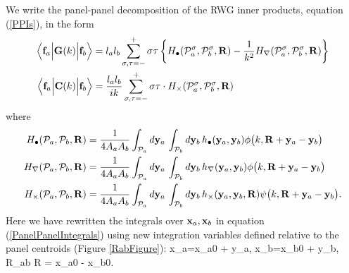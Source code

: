 \documentclass[letterpaper]{article}
\begin{document}
We write the panel-panel decomposition of the RWG inner products,
equation (\ref{PPIs}), in the form
\begin{subequations}
\begin{align}
 \Big\langle \mathbf{f}_a \Big| \mathbf{G}(k) \Big | \mathbf{f}_b \Big \rangle
&= l_a l_b \sum_{\sigma, \tau=-}^+
   \sigma \tau
   \left\{ H_\bullet(\mathcal{P}_a^\sigma, \mathcal{P}_b^\sigma, \mathbf{R}) 
           -\frac{1}{k^2} H_\nabla(\mathcal{P}_a^\sigma, \mathcal{P}_b^\sigma, \mathbf{R}) 
   \right\}
\\
 \Big\langle \mathbf{f}_a \Big| \mathbf{C}(k) \Big | \mathbf{f}_b \Big \rangle
&= 
   \frac{l_a l_b }{ik}
   \sum_{\sigma, \tau=-}^+
   \sigma \tau \cdot 
   H_\times(\mathcal{P}_a^\sigma, \mathcal{P}_b^\sigma, \mathbf{R}) 
\end{align}
\end{subequations}
where
\begin{subequations}
\begin{align}
 H_\bullet(\mathcal{P}_a, \mathcal{P}_b, \mathbf{R}) 
   &=\frac{1}{4A_a A_b} 
     \int_{\mathcal{P}_a} d\mathbf{y}_a \, \int_{\mathcal{P}_b} d\mathbf{y}_b \,
     h_\bullet(\mathbf{y}_a, \mathbf{y}_b)
     \phi\big(k, \mathbf{R} + \mathbf{y}_{a} - \mathbf{y}_{b} \big) 
\\
 H_\nabla(\mathcal{P}_a, \mathcal{P}_b, \mathbf{R}) 
   &=\frac{1}{4A_a A_b} 
     \int_{\mathcal{P}_a} d\mathbf{y}_a \, \int_{\mathcal{P}_b} d\mathbf{y}_b \,
     h_\nabla(\mathbf{y}_a, \mathbf{y}_b)
     \phi\big(k, \mathbf{R} + \mathbf{y}_{a} - \mathbf{y}_{b} \big) 
\\
 H_\times(\mathcal{P}_a, \mathcal{P}_b, \mathbf{R})
   &=\frac{1}{4A_a A_b}
     \int_{\mathcal{P}_a} d\mathbf{y}_a \, \int_{\mathcal{P}_b} d\mathbf{y}_b \,
     h_\times(\mathbf{y}_a, \mathbf{y}_b, \mathbf{R})
     \psi\big(k, \mathbf{R} + \mathbf{y}_{a} - \mathbf{y}_{b} \big). 
\end{align}
\label{ThreeHFunctions}
\end{subequations}
Here we have rewritten the integrals over $\mathbf{x}_a, \mathbf{x}_b$ in 
equation (\ref{PanelPanelIntegrals}) using new integration variables
defined relative to the panel centroids (Figure \ref{RabFigure}):
{
  \vb x_a=\vb x_{a0} + \vb y_a, 
   \qquad 
   \vb x_b=\vb x_{b0} + \vb y_b, 
   \qquad
   \vb R_{ab} \equiv \vb R = \vb x_{a0} - \vb x_{b0}.
}
\end{document}
